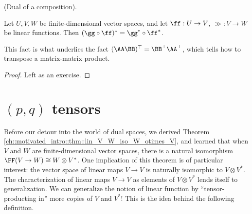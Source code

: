 \begin{theorem}
     (Dual of a composition).
     
     Let $U, V, W$ be finite-dimensional vector spaces, and let $\ff:U \rightarrow V$, $\gg:V \rightarrow W$ be linear functions. Then $(\gg \circ \ff)^* = \gg^* \circ \ff^*$. 
     
     This fact is what underlies the fact $(\AA \BB)^\top = \BB^\top \AA^\top$, which tells how to transpose a matrix-matrix product.
\end{theorem}

\begin{proof}
     Left as an exercise.
\end{proof}

\newpage

\section{$(p, q)$ tensors}

Before our detour into the world of dual spaces, we derived Theorem \ref{ch::motivated_intro::thm::lin_V_W_iso_W_otimes_V}, and learned that when $V$ and $W$ are finite-dimensional vector spaces, there is a natural isomorphism $\FF(V \rightarrow W) \cong W \otimes V^*$. One implication of this theorem is of particular interest: the vector space of linear maps $V \rightarrow V$ is naturally isomorphic to $V \otimes V^*$. The characterization of linear maps $V \rightarrow V$ as elements of $V \otimes V^*$ lends itself to generalization. We can generalize the notion of linear function by ``tensor-producting in'' more copies of $V$ and $V^*$! This is the idea behind the following definition.

